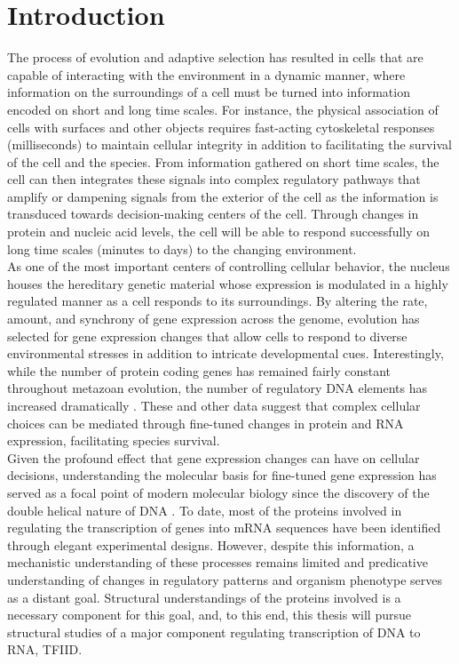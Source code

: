 \chapter{Introduction}

\indent The process of evolution and adaptive selection has resulted in cells that are capable of interacting with the environment in a dynamic manner, where information on the surroundings of a cell must be turned into information encoded on short and long time scales. For instance, the physical association of cells with surfaces and other objects requires fast-acting cytoskeletal responses (milliseconds) to maintain cellular integrity in addition to facilitating the survival of the cell and the species. From information gathered on short time scales, the cell can then integrates these signals into complex regulatory pathways that amplify or dampening signals from the exterior of the cell as the information is transduced towards decision-making centers of the cell.  Through changes in protein and nucleic acid levels, the cell will be able to respond successfully on long time scales (minutes to days) to the changing environment.\\
\indent As one of the most important centers of controlling cellular behavior, the nucleus houses the hereditary genetic material whose expression is modulated in a highly regulated manner as a cell responds to its surroundings. By altering the rate, amount, and synchrony of gene expression across the genome, evolution has selected for gene expression changes that allow cells to respond to diverse environmental stresses in addition to intricate developmental cues. Interestingly, while the number of protein coding genes has remained fairly constant throughout metazoan evolution, the number of regulatory DNA elements has increased dramatically \cite{Levine_1710}. These and other data suggest that complex cellular choices can be mediated through fine-tuned changes in protein and RNA expression, facilitating species survival. \\
\indent Given the profound effect that gene expression changes can have on cellular decisions, understanding the molecular basis for fine-tuned gene expression has served as a focal point of modern molecular biology since the discovery of the double helical nature of DNA \cite{Watson_4017}. To date, most of the proteins involved in regulating the transcription of genes into mRNA sequences have been identified through elegant experimental designs.  However, despite this information, a mechanistic understanding of these processes remains limited and predicative understanding of changes in regulatory patterns and organism phenotype serves as a distant goal. Structural understandings of the proteins involved is a necessary component for this goal, and, to this end, this thesis will pursue structural studies of a major component regulating transcription of DNA to RNA, TFIID.

